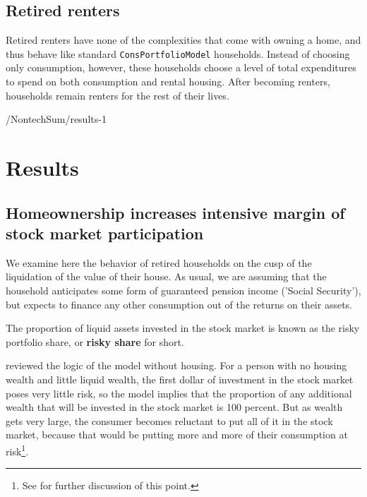 \documentclass[PortfolioChoiceWithRiskyHousing]{subfiles}
\begin{document}
\subsection{Retired renters}

Retired renters have none of the complexities that come with owning a home, and thus behave like standard \texttt{ConsPortfolioModel} households. Instead of choosing only consumption, however, these households choose a level of total expenditures to spend on both consumption and rental housing. After becoming renters, households remain renters for the rest of their lives.

\begin{verbatimwrite}{\LaTeXOutput/NontechSum/results-1}

  \section{Results}

  \subsection{Homeownership increases intensive margin of stock market participation}

  We examine here the behavior of retired households on the cusp of the liquidation of the value of their house.  As usual, we are assuming that the household anticipates some form of guaranteed pension income ('Social Security'), but expects to finance any other consumption out of the returns on their assets.

  The proportion of liquid assets invested in the stock market is known as the risky portfolio share, or \textbf{risky share} for short.

  \cite{Carroll2020} reviewed the logic of the model without housing. For a person with no housing wealth and little liquid wealth, the first dollar of investment in the stock market poses very little risk, so the model implies that the proportion of any additional wealth that will be invested in the stock market is 100 percent.  But as wealth gets very large, the consumer becomes reluctant to put all of it in the stock market, because that would be putting more and more of their consumption at risk\footnote{See \cite{Carroll2020} for further discussion of this point.}.

  \renewcommand{\figName}{shareFuncByHouse}
  \renewcommand{\figFile}{\figName} %



\end{verbatimwrite}
\end{document}
